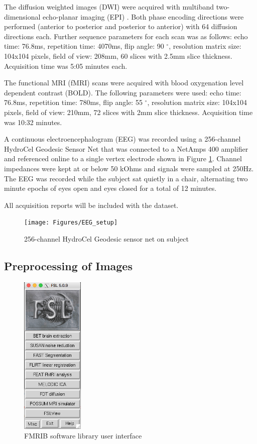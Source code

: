 The diffusion weighted images (DWI) were acquired with multiband two-dimensional echo-planar imaging (EPI) \cite{ref:epi}. Both phase encoding directions were performed (anterior to posterior and posterior to anterior) with 64 diffusion directions each. Further sequence parameters for each scan was as follows: echo time: 76.8ms, repetition time: 4070ms, flip angle: 90 $^{\circ}$, resolution matrix size: 104x104 pixels, field of view: 208mm, 60 slices with 2.5mm slice thickness. Acquisition time was 5:05 minutes each. 

The functional MRI (fMRI) scans were acquired with blood oxygenation level dependent contrast (BOLD). The following parameters were used:  echo time: 76.8ms, repetition time: 780ms, flip angle: 55 $^{\circ}$, resolution matrix size: 104x104 pixels, field of view: 210mm, 72 slices with 2mm slice thickness. Acquisition time was 10:32 minutes.

A continuous electroencephalogram (EEG) was recorded using a 256-channel HydroCel Geodesic Sensor Net that was connected to a NetAmps 400 amplifier and referenced online to a single vertex electrode shown in Figure \ref{fig:eegsetup}. Channel impedances were kept at or below 50 kOhms and signals were sampled at 250Hz. The EEG was recorded while the subject sat quietly in a chair, alternating two minute epochs of eyes open and eyes closed for a total of 12 minutes. 

All acquisition reports will be included with the dataset. 

\begin{figure}[!th]
    \centering
    \texttt{[image: Figures/EEG\_setup]}
    \caption{256-channel HydroCel Geodesic sensor net on subject}
    \label{fig:eegsetup}
\end{figure}

\subsection{Preprocessing of Images}
\label{sec:preprocess}

\begin{figure}
    \centering
    \vspace{-63pt}
    \includegraphics[width=3cm]{Figures/FSL}
    \caption{FMRIB software library user interface}
    \label{fig:fsl}
\end{figure}

